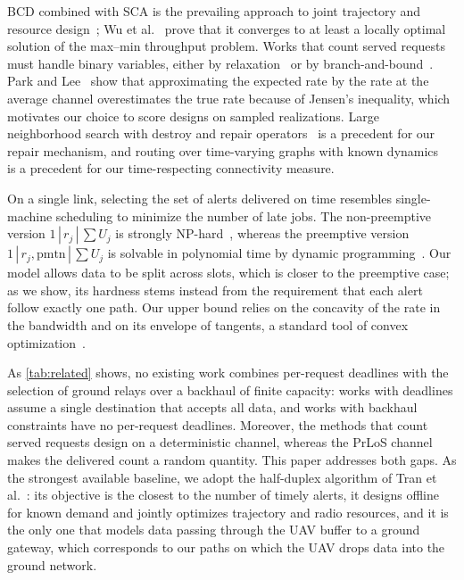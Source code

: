 BCD combined with SCA is the prevailing approach to joint trajectory and resource design~\cite{huang2025ddatsap,wu2018multi,liu2024interference}; Wu et al.~\cite{wu2018multi} prove that it converges to at least a locally optimal solution of the max--min throughput problem. Works that count served requests must handle binary variables, either by relaxation~\cite{tran2022relay} or by branch-and-bound~\cite{samir2020time}. Park and Lee~\cite{park2026expected} show that approximating the expected rate by the rate at the average channel overestimates the true rate because of Jensen's inequality, which motivates our choice to score designs on sampled realizations. Large neighborhood search with destroy and repair operators~\cite{ropke2006alns} is a precedent for our repair mechanism, and routing over time-varying graphs with known dynamics~\cite{jain2004dtn} is a precedent for our time-respecting connectivity measure.

On a single link, selecting the set of alerts delivered on time resembles single-machine scheduling to minimize the number of late jobs. The non-preemptive version $1\,|\,r_j\,|\,\sum U_j$ is strongly NP-hard~\cite{lenstra2020elements}, whereas the preemptive version $1\,|\,r_j,\mathrm{pmtn}\,|\,\sum U_j$ is solvable in polynomial time by dynamic programming~\cite{lawler1990preemptive}. Our model allows data to be split across slots, which is closer to the preemptive case; as we show, its hardness stems instead from the requirement that each alert follow exactly one path. Our upper bound relies on the concavity of the rate in the bandwidth and on its envelope of tangents, a standard tool of convex optimization~\cite{boyd2004convex}.

As \cref{tab:related} shows, no existing work combines per-request deadlines with the selection of ground relays over a backhaul of finite capacity: works with deadlines assume a single destination that accepts all data, and works with backhaul constraints have no per-request deadlines. Moreover, the methods that count served requests design on a deterministic channel, whereas the PrLoS channel makes the delivered count a random quantity. This paper addresses both gaps. As the strongest available baseline, we adopt the half-duplex algorithm of Tran et al.~\cite{tran2022relay}: its objective is the closest to the number of timely alerts, it designs offline for known demand and jointly optimizes trajectory and radio resources, and it is the only one that models data passing through the UAV buffer to a ground gateway, which corresponds to our paths on which the UAV drops data into the ground network.
